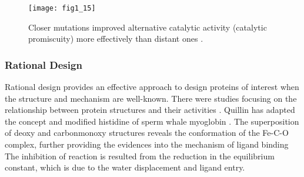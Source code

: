 \begin{refsection}
\begin{figure}[htbp] \centering \texttt{[image: fig1\_15]}
    \caption[Closer mutations improved alternative catalytic activity (catalytic promiscuity) more effectively than distant ones.]{Closer mutations improved alternative catalytic activity (catalytic promiscuity) more effectively than distant ones \cite{Kazlauskas2005a}.}
    \label{fig:protein-engineering-example} 
\end{figure}

\subsubsection{Rational Design}
\label{sec:rational-design}

Rational design provides an effective approach to design proteins of interest
when the structure and mechanism are well-known. There were studies focusing on
the relationship between protein structures and their activities
\cite{Beadle2002a,Quillin1993}. Quillin  has adapted the concept
and modified histidine of sperm whale myoglobin \cite{Quillin1993}. The
superposition of deoxy and carbonmonoxy structures reveals the conformation of
the Fe-C-O complex, further providing the evidences into the mechanism of
ligand binding \cite{Quillin1993} The inhibition of reaction is resulted from
the reduction in the equilibrium constant, which is due to the water
displacement and ligand entry. 


\end{refsection}
